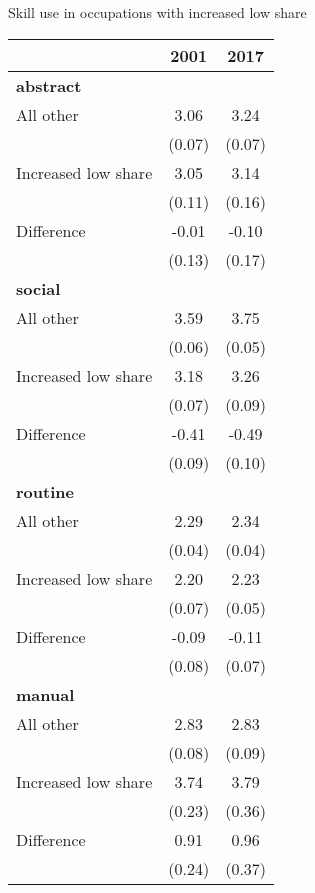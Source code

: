 \begin{center}
\begin{threeparttable}[!h]
\caption{Skill use in occupations with increased low share}
\begin{tabular}{lcc}
\toprule
\toprule
\textbf{}&\multicolumn{1}{c}{\textbf{2001}}&\multicolumn{1}{c}{\textbf{2017}} \\
\midrule
\textbf{abstract} \\
All other           &        3.06&        3.24\\
                    &      (0.07)&      (0.07)\\
Increased low share &        3.05&        3.14\\
                    &      (0.11)&      (0.16)\\
Difference          &       -0.01&       -0.10\\
                    &      (0.13)&      (0.17)\\
\textbf{social} \\
All other           &        3.59&        3.75\\
                    &      (0.06)&      (0.05)\\
Increased low share &        3.18&        3.26\\
                    &      (0.07)&      (0.09)\\
Difference          &       -0.41&       -0.49\\
                    &      (0.09)&      (0.10)\\
\textbf{routine} \\
All other           &        2.29&        2.34\\
                    &      (0.04)&      (0.04)\\
Increased low share &        2.20&        2.23\\
                    &      (0.07)&      (0.05)\\
Difference          &       -0.09&       -0.11\\
                    &      (0.08)&      (0.07)\\
\textbf{manual} \\
All other           &        2.83&        2.83\\
                    &      (0.08)&      (0.09)\\
Increased low share &        3.74&        3.79\\
                    &      (0.23)&      (0.36)\\
Difference          &        0.91&        0.96\\
                    &      (0.24)&      (0.37)\\
\bottomrule
\bottomrule
\end{tabular}
\end{threeparttable}
\end{center}
